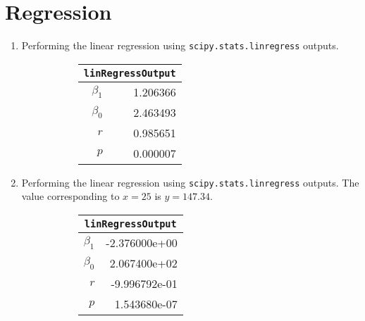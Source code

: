 \chapter{Regression}

\begin{enumerate}
	
\item Performing the linear regression using \texttt{scipy.stats.linregress} outputs.

\begin{figure}[H]
	\begin{subfigure}[l]{0.2\linewidth}
		\centering
		\begin{tabular}{@{}rr@{}}
			\toprule
			\multicolumn{2}{c}{\texttt{linRegressOutput}} \\
			\midrule
			$\beta_1$     &         1.206366 \\
			$\beta_0$ &         2.463493 \\
			$r$    &         0.985651 \\
			$p$    &         0.000007 \\
			\bottomrule
		\end{tabular}
	\end{subfigure}
	\begin{subfigure}[]{0.8\linewidth}
		\centering
	\end{subfigure}
\end{figure}

\item Performing the linear regression using \texttt{scipy.stats.linregress} outputs.
The value corresponding to $ x = 25 $ is $ y = 147.34 $.

\begin{figure}[H]
	\begin{subfigure}[]{0.2\linewidth}
		\centering
		\begin{tabular}{@{}rr@{}}
			\toprule
			\multicolumn{2}{c}{\texttt{linRegressOutput}} \\
			\midrule
			$\beta_1$     &    -2.376000e+00 \\
			$\beta_0$ &     2.067400e+02 \\
			$r$    &    -9.996792e-01 \\
			$p$    &     1.543680e-07 \\
			\bottomrule
		\end{tabular}
		

\end{subfigure}
\end{figure}
\end{enumerate}
